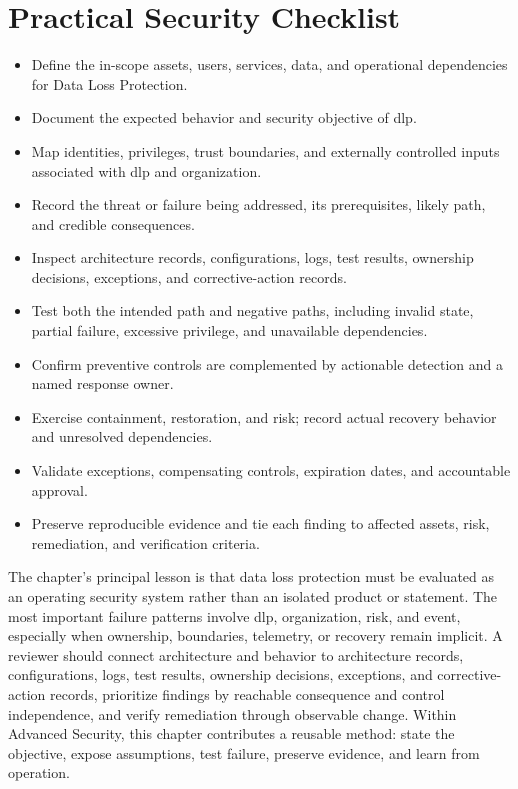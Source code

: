 \documentclass[11pt]{article}
\begin{document}
\section*{Practical Security Checklist}
\begin{itemize}[label=$\square$]
\item Define the in-scope assets, users, services, data, and operational dependencies for Data Loss Protection.
\item Document the expected behavior and security objective of dlp.
\item Map identities, privileges, trust boundaries, and externally controlled inputs associated with dlp and organization.
\item Record the threat or failure being addressed, its prerequisites, likely path, and credible consequences.
\item Inspect architecture records, configurations, logs, test results, ownership decisions, exceptions, and corrective-action records.
\item Test both the intended path and negative paths, including invalid state, partial failure, excessive privilege, and unavailable dependencies.
\item Confirm preventive controls are complemented by actionable detection and a named response owner.
\item Exercise containment, restoration, and risk; record actual recovery behavior and unresolved dependencies.
\item Validate exceptions, compensating controls, expiration dates, and accountable approval.
\item Preserve reproducible evidence and tie each finding to affected assets, risk, remediation, and verification criteria.
\end{itemize}
\begin{synthesisbox}
The chapter's principal lesson is that data loss protection must be evaluated as an operating security system rather than an isolated product or statement. The most important failure patterns involve dlp, organization, risk, and event, especially when ownership, boundaries, telemetry, or recovery remain implicit. A reviewer should connect architecture and behavior to architecture records, configurations, logs, test results, ownership decisions, exceptions, and corrective-action records, prioritize findings by reachable consequence and control independence, and verify remediation through observable change. Within Advanced Security, this chapter contributes a reusable method: state the objective, expose assumptions, test failure, preserve evidence, and learn from operation.
\end{synthesisbox}
\end{document}
